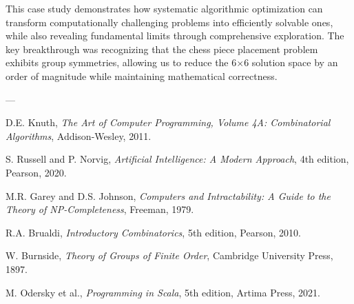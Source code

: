\documentclass[12pt,a4paper]{article}
\theoremstyle{definition}
\begin{document}
This case study demonstrates how systematic algorithmic optimization can transform computationally challenging problems into efficiently solvable ones, while also revealing fundamental limits through comprehensive exploration. The key breakthrough was recognizing that the chess piece placement problem exhibits group symmetries, allowing us to reduce the 6$\times$6 solution space by an order of magnitude while maintaining mathematical correctness.

---


\begin{thebibliography}{99}

D.E. Knuth, \emph{The Art of Computer Programming, Volume 4A: Combinatorial Algorithms}, Addison-Wesley, 2011.

S. Russell and P. Norvig, \emph{Artificial Intelligence: A Modern Approach}, 4th edition, Pearson, 2020.

M.R. Garey and D.S. Johnson, \emph{Computers and Intractability: A Guide to the Theory of NP-Completeness}, Freeman, 1979.

R.A. Brualdi, \emph{Introductory Combinatorics}, 5th edition, Pearson, 2010.

W. Burnside, \emph{Theory of Groups of Finite Order}, Cambridge University Press, 1897.

M. Odersky et al., \emph{Programming in Scala}, 5th edition, Artima Press, 2021.

\end{thebibliography}
\end{document}
